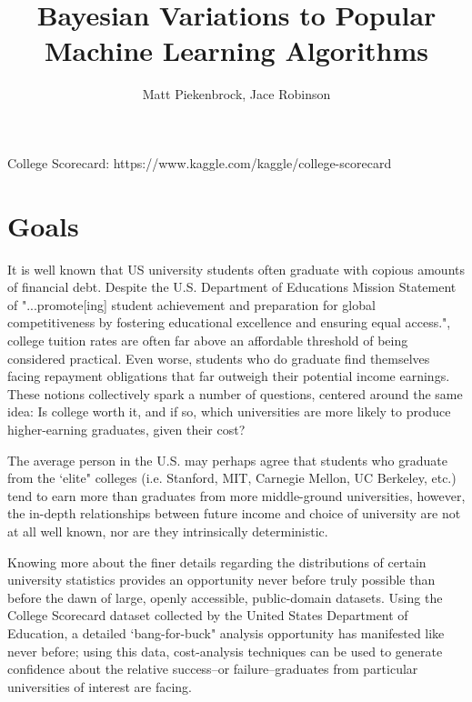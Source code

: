 \documentclass[10pt]{article}
\author{Matt Piekenbrock, Jace Robinson}
\begin{document}
\vspace{0.1in}
\title{Bayesian Variations to Popular Machine Learning Algorithms}

College Scorecard: 
https://www.kaggle.com/kaggle/college-scorecard

\section{Goals} 
    It is well known that US university students often graduate with copious amounts of financial debt. Despite the U.S. Department of Educations Mission Statement of "...promote[ing] student achievement and preparation for global competitiveness by fostering educational excellence and ensuring equal access.", college tuition rates are often far above an affordable threshold of being considered practical. Even worse, students who do graduate find themselves facing repayment obligations that far outweigh their potential income earnings. These notions collectively spark a number of questions, centered around the same idea: Is college worth it, and if so, which universities are more likely to produce higher-earning graduates, given their cost? 

    The average person in the U.S. may perhaps agree that students who graduate from the `elite" colleges (i.e. Stanford, MIT, Carnegie Mellon, UC Berkeley, etc.) tend to earn more than graduates from more middle-ground universities, however, the in-depth relationships between future income and choice of university are not at all well known, nor are they intrinsically deterministic. 

    Knowing more about the finer details regarding the distributions of certain university statistics provides an opportunity never before truly possible than before the dawn of large, openly accessible, public-domain datasets. Using the College Scorecard dataset collected by the United States Department of Education, a detailed `bang-for-buck" analysis opportunity has manifested like never before; using this data, cost-analysis techniques can be used to generate confidence about the relative success--or failure--graduates from particular universities of interest are facing. 
    
\end{document}
